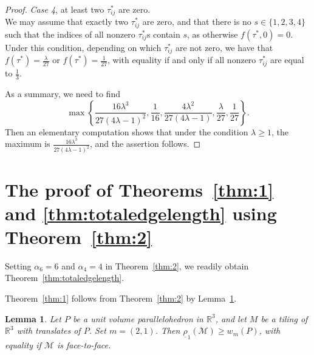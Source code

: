 \documentclass[twoside]{amsart}
\newtheorem{lem}{Lemma}
\theoremstyle{definition}
\renewcommand{\Re}{\mathbb R}
\newcommand{\M}{\mathcal{M}}
\begin{document}
\begin{proof}
\emph{Case 4}, at least two $\tau_{ij}^*$ are zero.\\
We may assume that exactly two $\tau_{ij}^*$ are zero, and that there is no $s \in \{1,2,3,4\}$ such that the indices of all nonzero $\tau_{ij}^*$s contain $s$, as otherwise $f(\tau^*,0)=0$. Under this condition, depending on which $\tau_{ij}^*$ are not zero, we have that $f(\tau^*)=\frac{\lambda}{27}$ or $f(\tau^*)=\frac{1}{27}$, with equality if and only if all nonzero $\tau_{ij}^*$ are equal to $\frac{1}{3}$.

As a summary, we need to find
\[
\max \left \{ \frac{16 \lambda^3}{27(4\lambda - 1)^2}, \frac{1}{16}, \frac{4\lambda^2}{27(4\lambda-1)}, \frac{\lambda}{27}, \frac{1}{27} \right\}.
\]
Then an elementary computation shows that under the condition $\lambda \geq 1$, the maximum is $\frac{16 \lambda^3}{27(4\lambda - 1)^2}$, and the assertion follows.
\end{proof}







\section{The proof of Theorems~\ref{thm:1} and \ref{thm:totaledgelength} using Theorem~\ref{thm:2}}\label{sec:thm1}

Setting $\alpha_6=6$ and $\alpha_4=4$ in Theorem~\ref{thm:2}, we readily obtain Theorem~\ref{thm:totaledgelength}.

Theorem~\ref{thm:1} follows from Theorem~\ref{thm:2} by Lemma~\ref{lem:weights}.

\begin{lem}\label{lem:weights}
Let $P$ be a unit volume parallelohedron in $\Re^3$, and let $M$ be a tiling of $\Re^3$ with translates of $P$.
Set $m=(2,1)$. Then $\underline{\rho}_1(\M) \geq w_m(P)$, with equality if $\M$ is face-to-face.
\end{lem}
\end{document}
